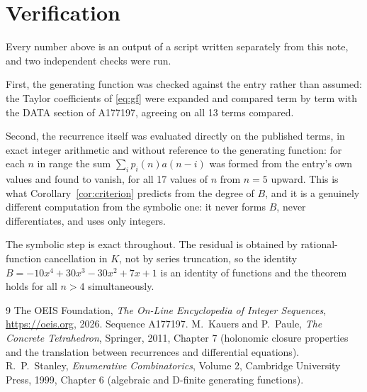 \documentclass[11pt,a4paper]{article}
\theoremstyle{plain}
\theoremstyle{definition}
\begin{document}
\section{Verification}

Every number above is an output of a script written separately from this note, and two
independent checks were run.

First, the generating function was checked against the entry rather than assumed: the
Taylor coefficients of \eqref{eq:gf} were expanded and compared term by term with the DATA
section of A177197, agreeing on all 13 terms compared.

Second, the recurrence itself was evaluated directly on the published terms, in exact
integer arithmetic and without reference to the generating function: for each $n$ in range
the sum $\sum_{i}p_{i}(n)a(n-i)$ was formed from the entry's own values and found to
vanish, for all 17 values of $n$ from $n=5$ upward. This is what
Corollary~\ref{cor:criterion} predicts from the degree of $B$, and it is a genuinely
different computation from the symbolic one: it never forms $B$, never differentiates, and
uses only integers.

The symbolic step is exact throughout. The residual is obtained by rational-function
cancellation in $K$, not by series truncation, so the identity $B=- 10 x^{4} + 30 x^{3} - 30 x^{2} + 7 x + 1$ is an
identity of functions and the theorem holds for all $n>4$ simultaneously.

\begin{thebibliography}{9}
 The OEIS Foundation, \emph{The On-Line Encyclopedia of Integer Sequences},
\url{https://oeis.org}, 2026. Sequence A177197.
 M.~Kauers and P.~Paule, \emph{The Concrete Tetrahedron}, Springer, 2011,
Chapter 7 (holonomic closure properties and the translation between recurrences and
differential equations).
 R.~P.~Stanley, \emph{Enumerative Combinatorics}, Volume 2, Cambridge
University Press, 1999, Chapter 6 (algebraic and D-finite generating functions).
\end{thebibliography}
\end{document}
